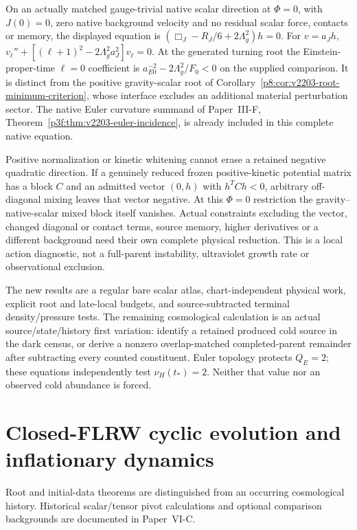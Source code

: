 \documentclass[12pt,a4paper]{article}
\begin{document}
\begin{remark}
\label{p8:rem:v2203-native-low-mode-scope}
On an actually matched gauge-trivial native scalar direction at $\Phi=0$,
with $J(0)=0$, zero native background velocity and no residual scalar
force, contacts or memory, the displayed equation is
$(\Box_J-R_J/6+2\Lambda_g^2)h=0$.
For $v=a_Jh$,
$v_\ell''+[(\ell+1)^2-2\Lambda_g^2a_J^2]v_\ell=0$.
At the generated turning root the Einstein-proper-time $\ell=0$ coefficient is
$a_{E0}^{-2}-2\Lambda_g^2/F_0<0$ on the supplied comparison.
It is distinct from the positive gravity-scalar root of
Corollary~\ref{p8:cor:v2203-root-minimum-criterion}, whose interface excludes
an additional material perturbation sector.
The native Euler curvature summand of
Paper~III-F, Theorem~\ref{p3f:thm:v2203-euler-incidence}, is already included
in this complete native equation.

Positive normalization or kinetic whitening cannot erase a retained
negative quadratic direction. If a genuinely reduced frozen positive-kinetic
potential matrix has a block $C$ and an admitted vector $(0,h)$ with
$h^TCh<0$, arbitrary off-diagonal mixing leaves that vector negative.
At this $\Phi=0$ restriction the gravity--native-scalar mixed block itself
vanishes. Actual constraints excluding the vector, changed diagonal or
contact terms, source memory, higher derivatives or a different background
need their own complete physical reduction.
This is a local action diagnostic, not a full-parent instability,
ultraviolet growth rate or observational exclusion.
\end{remark}

The new results are a regular bare scalar atlas, chart-independent physical
work, explicit root and late-local budgets, and source-subtracted terminal
density/pressure tests. The remaining cosmological calculation is an actual
source/state/history first variation: identify a retained produced cold
source in the dark census, or derive a nonzero overlap-matched completed-parent
remainder after subtracting every counted constituent.
Euler topology protects $Q_E=2$; these equations independently test
$\nu_H(t_*)=2$. Neither that value nor an observed cold abundance is forced.




\section{Closed-FLRW cyclic evolution and inflationary dynamics}
\label{p6a:sec:organized-a4}
Root and initial-data theorems are distinguished from an occurring cosmological history. Historical scalar/tensor pivot calculations and optional comparison backgrounds are documented in Paper~VI-C.
\end{document}
